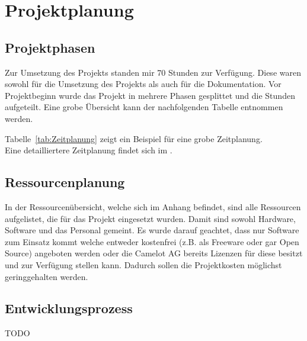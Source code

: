 \section{Projektplanung} 
\label{sec:Projektplanung}


\subsection{Projektphasen}
\label{sec:Projektphasen}
Zur Umsetzung des Projekts standen mir 70 Stunden zur Verfügung. Diese waren sowohl für die Umsetzung des Projekts als auch für die Dokumentation. Vor Projektbeginn wurde das Projekt in mehrere Phasen gesplittet und die Stunden aufgeteilt. Eine grobe Übersicht kann der nachfolgenden Tabelle entnommen werden. 

Tabelle~\ref{tab:Zeitplanung} zeigt ein Beispiel für eine grobe Zeitplanung.
\\
Eine detailliertere Zeitplanung findet sich im .


\subsection{Ressourcenplanung}
\label{sec:Ressourcenplanung}
In der Ressourcenübersicht, welche sich im Anhang befindet, sind alle Ressourcen aufgelistet, die für das Projekt eingesetzt wurden. Damit sind sowohl Hardware, Software und das Personal gemeint. Es wurde darauf geachtet, dass nur Software zum Einsatz kommt welche entweder kostenfrei (z.B. als Freeware oder gar Open Source) angeboten werden oder die Camelot AG bereits Lizenzen für diese besitzt und zur Verfügung stellen kann. Dadurch sollen die Projektkosten möglichst geringgehalten werden. 


\subsection{Entwicklungsprozess}
\label{sec:Entwicklungsprozess}
TODO
